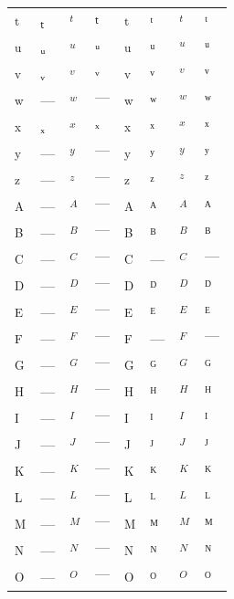 \documentclass{standalone}
\begin{document}
\begin{tabular}{ll|ll|ll|ll}
\textsubscript{t} & ₜ & $_{t}$ & $ₜ$ & \textsuperscript{t} & ᵗ & $^{t}$ & $ᵗ$ \\
\textsubscript{u} & ᵤ & $_{u}$ & $ᵤ$ & \textsuperscript{u} & ᵘ & $^{u}$ & $ᵘ$ \\
\textsubscript{v} & ᵥ & $_{v}$ & $ᵥ$ & \textsuperscript{v} & ᵛ & $^{v}$ & $ᵛ$ \\
\textsubscript{w} & — & $_{w}$ & $—$ & \textsuperscript{w} & ʷ & $^{w}$ & $ʷ$ \\
\textsubscript{x} & ₓ & $_{x}$ & $ₓ$ & \textsuperscript{x} & ˣ & $^{x}$ & $ˣ$ \\
\textsubscript{y} & — & $_{y}$ & $—$ & \textsuperscript{y} & ʸ & $^{y}$ & $ʸ$ \\
\textsubscript{z} & — & $_{z}$ & $—$ & \textsuperscript{z} & ᶻ & $^{z}$ & $ᶻ$ \\
\midrule
\textsubscript{A} & — & $_{A}$ & $—$ & \textsuperscript{A} & ᴬ & $^{A}$ & $ᴬ$ \\
\textsubscript{B} & — & $_{B}$ & $—$ & \textsuperscript{B} & ᴮ & $^{B}$ & $ᴮ$ \\
\textsubscript{C} & — & $_{C}$ & $—$ & \textsuperscript{C} & — & $^{C}$ & $—$ \\
\textsubscript{D} & — & $_{D}$ & $—$ & \textsuperscript{D} & ᴰ & $^{D}$ & $ᴰ$ \\
\textsubscript{E} & — & $_{E}$ & $—$ & \textsuperscript{E} & ᴱ & $^{E}$ & $ᴱ$ \\
\textsubscript{F} & — & $_{F}$ & $—$ & \textsuperscript{F} & — & $^{F}$ & $—$ \\
\textsubscript{G} & — & $_{G}$ & $—$ & \textsuperscript{G} & ᴳ & $^{G}$ & $ᴳ$ \\
\textsubscript{H} & — & $_{H}$ & $—$ & \textsuperscript{H} & ᴴ & $^{H}$ & $ᴴ$ \\
\textsubscript{I} & — & $_{I}$ & $—$ & \textsuperscript{I} & ᴵ & $^{I}$ & $ᴵ$ \\
\textsubscript{J} & — & $_{J}$ & $—$ & \textsuperscript{J} & ᴶ & $^{J}$ & $ᴶ$ \\
\textsubscript{K} & — & $_{K}$ & $—$ & \textsuperscript{K} & ᴷ & $^{K}$ & $ᴷ$ \\
\textsubscript{L} & — & $_{L}$ & $—$ & \textsuperscript{L} & ᴸ & $^{L}$ & $ᴸ$ \\
\textsubscript{M} & — & $_{M}$ & $—$ & \textsuperscript{M} & ᴹ & $^{M}$ & $ᴹ$ \\
\textsubscript{N} & — & $_{N}$ & $—$ & \textsuperscript{N} & ᴺ & $^{N}$ & $ᴺ$ \\
\textsubscript{O} & — & $_{O}$ & $—$ & \textsuperscript{O} & ᴼ & $^{O}$ & $ᴼ$ \\

\end{tabular}
\end{document}
